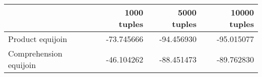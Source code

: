 \begin{tabular}{lrrr}
\toprule
 & 1000 tuples & 5000 tuples & 10000 tuples \\
\midrule
Product equijoin & -73.745666 & -94.456930 & -95.015077 \\
Comprehension equijoin & -46.104262 & -88.451473 & -89.762830 \\
\bottomrule
\end{tabular}
